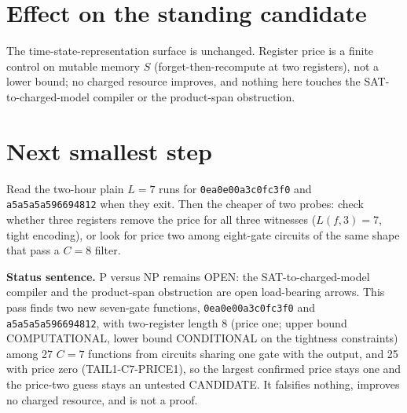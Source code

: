\documentclass[11pt]{article}
\begin{document}
\section*{Effect on the standing candidate}
The time-state-representation surface is unchanged. Register price is a finite control on mutable memory $S$ (forget-then-recompute at two registers), not a lower bound; no charged resource improves, and nothing here touches the SAT-to-charged-model compiler or the product-span obstruction.

\section*{Next smallest step}
Read the two-hour plain $L=7$ runs for \texttt{0ea0e00a3c0fc3f0} and \texttt{a5a5a5a596694812} when they exit. Then the cheaper of two probes: check whether three registers remove the price for all three witnesses ($L(f,3)=7$, tight encoding), or look for price two among eight-gate circuits of the same shape that pass a $C=8$ filter.

\bigskip
\noindent\textbf{Status sentence.} P versus NP remains OPEN: the SAT-to-charged-model compiler and the product-span obstruction are open load-bearing arrows. This pass finds two new seven-gate functions, \texttt{0ea0e00a3c0fc3f0} and \texttt{a5a5a5a596694812}, with two-register length 8 (price one; upper bound COMPUTATIONAL, lower bound CONDITIONAL on the tightness constraints) among 27 $C=7$ functions from circuits sharing one gate with the output, and 25 with price zero (TAIL1-C7-PRICE1), so the largest confirmed price stays one and the price-two guess stays an untested CANDIDATE. It falsifies nothing, improves no charged resource, and is not a proof.
\end{document}
